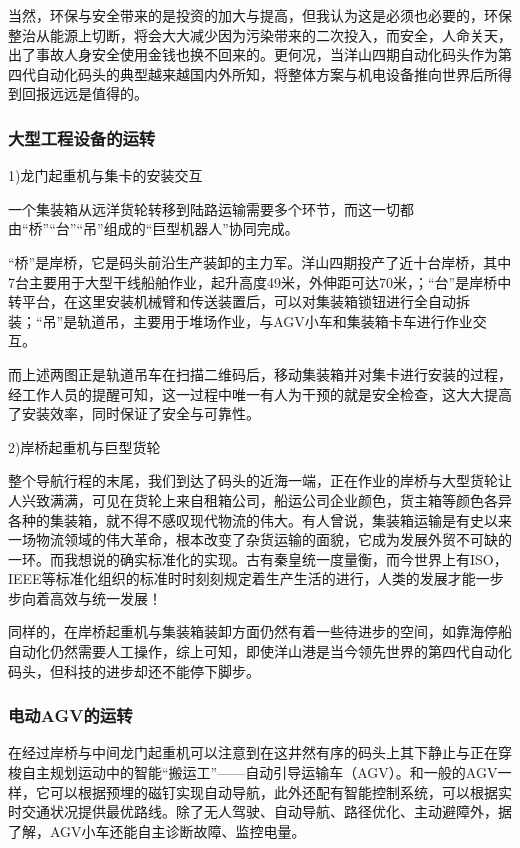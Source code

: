 当然，环保与安全带来的是投资的加大与提高，但我认为这是必须也必要的，环保整治从能源上切断，将会大大减少因为污染带来的二次投入，而安全，人命关天，出了事故人身安全使用金钱也换不回来的。更何况，当洋山四期自动化码头作为第四代自动化码头的典型越来越国内外所知，将整体方案与机电设备推向世界后所得到回报远远是值得的。

\subsubsection{大型工程设备的运转}

1)龙门起重机与集卡的安装交互

一个集装箱从远洋货轮转移到陆路运输需要多个环节，而这一切都由“桥”“台”“吊”组成的“巨型机器人”协同完成。

“桥”是岸桥，它是码头前沿生产装卸的主力军。洋山四期投产了近十台岸桥，其中7台主要用于大型干线船舶作业，起升高度49米，外伸距可达70米，；“台”是岸桥中转平台，在这里安装机械臂和传送装置后，可以对集装箱锁钮进行全自动拆装；“吊”是轨道吊，主要用于堆场作业，与AGV小车和集装箱卡车进行作业交互。

而上述两图正是轨道吊车在扫描二维码后，移动集装箱并对集卡进行安装的过程，经工作人员的提醒可知，这一过程中唯一有人为干预的就是安全检查，这大大提高了安装效率，同时保证了安全与可靠性。

2)岸桥起重机与巨型货轮

整个导航行程的末尾，我们到达了码头的近海一端，正在作业的岸桥与大型货轮让人兴致满满，可见在货轮上来自租箱公司，船运公司企业颜色，货主箱等颜色各异各种的集装箱，就不得不感叹现代物流的伟大。有人曾说，集装箱运输是有史以来一场物流领域的伟大革命，根本改变了杂货运输的面貌，它成为发展外贸不可缺的一环。而我想说的确实标准化的实现。古有秦皇统一度量衡，而今世界上有ISO，IEEE等标准化组织的标准时时刻刻规定着生产生活的进行，人类的发展才能一步步向着高效与统一发展！

同样的，在岸桥起重机与集装箱装卸方面仍然有着一些待进步的空间，如靠海停船自动化仍然需要人工操作，综上可知，即使洋山港是当今领先世界的第四代自动化码头，但科技的进步却还不能停下脚步。

\subsubsection{电动AGV的运转}

在经过岸桥与中间龙门起重机可以注意到在这井然有序的码头上其下静止与正在穿梭自主规划运动中的智能“搬运工”——自动引导运输车（AGV）。和一般的AGV一样，它可以根据预埋的磁钉实现自动导航，此外还配有智能控制系统，可以根据实时交通状况提供最优路线。除了无人驾驶、自动导航、路径优化、主动避障外，据了解，AGV小车还能自主诊断故障、监控电量。

